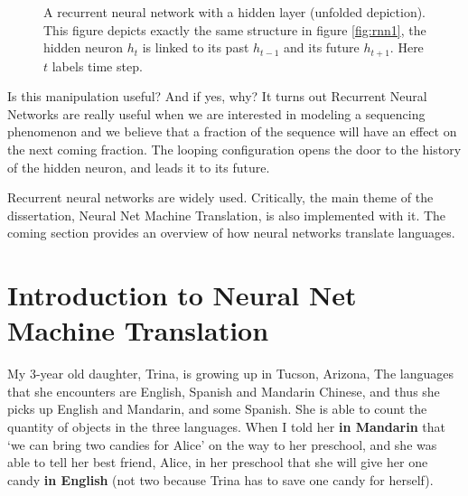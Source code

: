 \documentclass[final]{ua-thesis}
\numberwithin{equation}{section}
\begin{document}
\begin{figure}
\caption{A recurrent neural network with a hidden layer (unfolded depiction). This figure depicts exactly the same structure in figure \ref{fig:rnn1}, the hidden neuron $h_{t}$ is linked to its past $h_{t-1}$ and its future $h_{t+1}$. Here $t$ labels time step.}
\centering
{}
\end{figure}
\newpage
Is this manipulation useful? And if yes, why? It turns out Recurrent Neural Networks are really useful when we are interested in modeling a sequencing phenomenon and we believe that a fraction of the sequence will have an effect on the next coming fraction. The looping configuration opens the door to the history of the hidden neuron, and leads it to its future. 

Recurrent neural networks are widely used. Critically, the main theme of the dissertation, Neural Net Machine Translation, is also implemented with it. The coming section provides an overview of how neural networks translate languages. 

\section{Introduction to Neural Net Machine Translation}

My 3-year old daughter, Trina, is growing up in Tucson, Arizona, The languages that she encounters are English, Spanish and Mandarin Chinese, and thus she picks up English and Mandarin, and some Spanish. She is able to count the quantity of objects in the three languages. When I told her \textbf{in  Mandarin} that `we can bring two candies for Alice' on the way to her preschool, and she was able to tell her best friend, Alice, in her preschool that she will give her one candy \textbf{in English} (not two because Trina has to save one candy for herself).        
\end{document}
